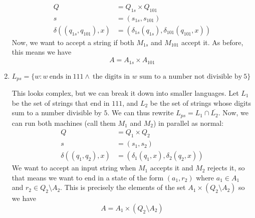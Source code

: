 \documentclass[fleqn]{article}
\begin{document}
\begin{enumerate}
\begin{answer}
\[\begin{aligned}
                Q &= Q_{1s} \times Q_{101} \\
                s &= (s_{1s}, s_{101}) \\
                \delta((q_{1s}, q_{101}), x) &= (\delta_{1s}(q_{1s}), \delta_{101}(q_{101},x))
            \end{aligned}
        \]
        Now, we want to accept a string if both $M_{1s}$ and $M_{101}$ accept it. As before, this means we have
        \[
            A = A_{1s} \times A_{101}
        \]
    \end{answer}
    \item $L_{ps} = \{w : w~\text{ends in}~111\wedge ~\text{the digits in $w$ sum to a number not divisible by}~5\}$
    \begin{answer}
        This looks complex, but we can break it down into smaller languages. Let $L_1$ be the set of strings that end in $111$, and $L_2$ be the set of strings whose digits sum to a number divisible by $5$. We can thus rewrite $L_{ps} = L_1 \cap \overline{L_2}$. Now, we can run both machines (call them $M_1$ and $M_2$) in parallel as normal:
        \[
            \begin{aligned}
                Q &= Q_1 \times Q_2 \\
                s &= (s_1, s_2) \\
                \delta((q_1,q_2), x) &= (\delta_1(q_1,x),\delta_2(q_2,x))
            \end{aligned}
        \]
        We want to accept an input string when $M_1$ accepts it and $M_2$ rejects it, so that means we want to end in a state of the form $(a_1,r_2)$ where $a_1 \in A_1$ and $r_2 \in Q_2 \setminus A_2$. This is precisely the elements of the set $A_1 \times (Q_2 \setminus A_2)$ so we have
        \[
            A = A_1 \times (Q_2 \setminus A_2)
        \]
    \end{answer}
\end{enumerate}
\end{document}
